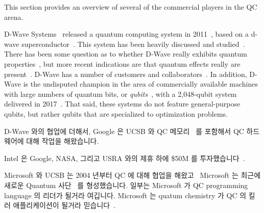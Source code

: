 This section provides an overview of several of the commercial
players in the QC arena.

D-Wave Systems~\cite{D-WaveSystemsHomePage}
released a quantum computing system
in 2011~\cite{WikipediaD-WaveSystems}, based on a d-wave
superconductor~\cite{MHSAmin2000D-Wave-superconductor}.
This system has been heavily discussed and
studied~\cite{KamranKarimi2011D-WaveAdiabatic}.
There has been some question as to whether D-Wave really exhibits quantum
properties~\cite{SeungWooShin2014IsDwaveQuantum}, but more recent
indications are that quantum effects really are
present~\cite{PhysRevA.91.042314,PhysRevX.4.021041}.
D-Wave has a number of customers and
collaborators~\cite{JeffreyBurt2014Google-QC-Chip,PatrickHarris2015QC-Google-NASA-DWave,ToddRWeiss2013Google-QC-AI-Lab}.
In addition, D-Wave is the undisputed champion in the area of commercially
available machines with large numbers of quantum bits, or
\emph{qubits}~\cite{WikipediaD-WaveSystems},
with a 2,048-qubit system delivered in
2017~\cite{AgamShah2016D-Wave-2000-qubit,BradJones2017D-Wave2000Sale}.
That said, these systems do not feature general-purpose qubits, but
rather qubits that are specialized to optimization problems.
\fi

D-Wave 와의 협업에 더해서, Google 은 UCSB 와 QC
메모리~\cite{JaikumarVijayan2015Google-UCSB-QC-Memory} 를 포함해서 QC
하드웨어에 대해 작업을 해왔습니다.

Intel 은 Google, NASA, 그리고 USRA 와의 제휴 하에 \$50M 를
투자했습니다~\cite{StaceyHigginbotham2015Intel-QC-invest-50M}.

Microsoft 와 UCSB 는 2004 년부터 QC 에 대해 협업을
해왔고~\cite{PedroHernandez2014MicrosoftStationQ-QC} Microsoft 는 최근에 새로운
Quantum 사단~\cite{PedroHernandez2016Microsoft-QC} 를 형성했습니다.
일부는 Microsoft 가 QC programming language 의 리더가 될거라 여깁니다.
Microsoft 는 quatum chemistry 가 QC 의 킬러 애플리케이션이 될거라
믿습니다~\cite{TomSimonite2017QC-MS-Chemistry}.

